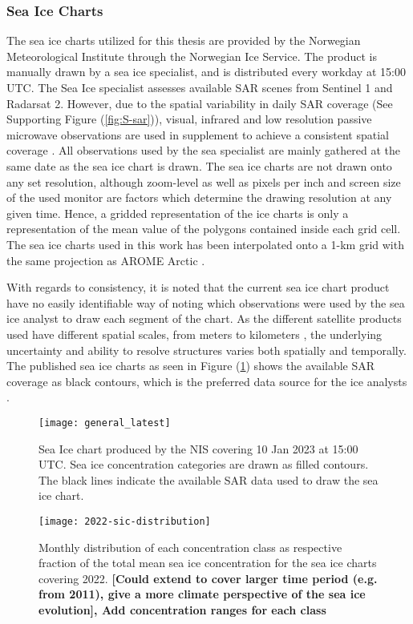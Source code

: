 \documentclass[../main/thesis.tex]{subfiles}
\begin{document}
\subsubsection{Sea Ice Charts}
\label{sec:sea-ice-charts}
The sea ice charts utilized for this thesis are provided by the Norwegian Meteorological Institute through the Norwegian Ice Service. The product is manually drawn by a sea ice specialist, and is distributed every workday at 15:00 UTC. The Sea Ice specialist assesses available SAR scenes from Sentinel 1 and Radarsat 2. However, due to the spatial variability in daily SAR coverage (See Supporting Figure (\ref{fig:S-sar})), visual, infrared and low resolution passive microwave observations are used in supplement to achieve a consistent spatial coverage \citep{Dinessen2020}. All observations used by the sea specialist are mainly gathered at the same date as the sea ice chart is drawn. The sea ice charts are not drawn onto any set resolution, although zoom-level as well as pixels per inch and screen size of the used monitor are factors which determine the drawing resolution at any given time. Hence, a gridded representation of the ice charts is only a representation of the mean value of the polygons contained inside each grid cell. The sea ice charts used in this work has been interpolated onto a 1-km grid with the same projection as AROME Arctic \citep{Mueller2017}.

With regards to consistency, it is noted that the current sea ice chart product have no easily identifiable way of noting which observations were used by the sea ice analyst to draw each segment of the chart. As the different satellite products used have different spatial scales, from meters to kilometers \citep{Dinessen2020}, the underlying uncertainty and ability to resolve structures varies both spatially and temporally. The published sea ice charts as seen in Figure (\ref{fig:icechart}) shows the available SAR coverage as black contours, which is the preferred data source for the ice analysts \citep{Dinessen2020}. 

\begin{figure}
    \centering
    \texttt{[image: general\_latest]}
    \caption{\label{fig:icechart}Sea Ice chart produced by the NIS covering 10 Jan 2023 at 15:00 UTC. Sea ice concentration categories are drawn as filled contours. The black lines indicate the available SAR data used to draw the sea ice chart.}
\end{figure}

\begin{figure}
    \centering
    \texttt{[image: 2022-sic-distribution]}
    \caption{\label{fig:2022-areadist-sic}Monthly distribution of each concentration class as respective fraction of the total mean sea ice concentration for the sea ice charts covering 2022. \textbf{[Could extend to cover larger time period (e.g. from 2011), give a more climate perspective of the sea ice evolution], Add concentration ranges for each class}}
\end{figure}
\end{document}
